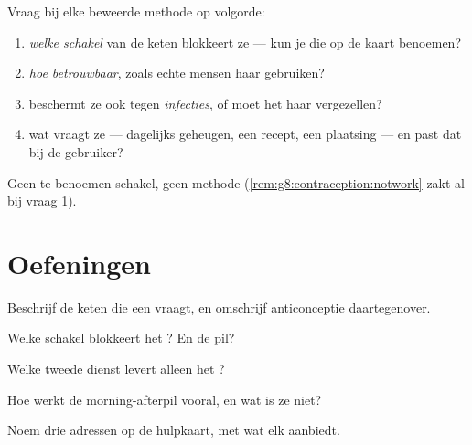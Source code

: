 \begin{method}\label{met:g8:contraception:evaluate}
Vraag bij elke beweerde methode op volgorde:
\begin{enumerate}
  \item \emph{welke schakel} van de keten blokkeert ze --- kun je die op
        de kaart benoemen?
  \item \emph{hoe betrouwbaar}, zoals echte mensen haar gebruiken?
  \item beschermt ze ook tegen \emph{infecties}, of moet het  haar
        vergezellen?
  \item wat vraagt ze --- dagelijks geheugen, een recept, een plaatsing
        --- en past dat bij de gebruiker?
\end{enumerate}
Geen te benoemen schakel, geen methode
(\cref{rem:g8:contraception:notwork} zakt al bij vraag 1).
\end{method}

\section{Oefeningen}

\begin{exercise}[$\star$]\label{exo:g8:contraception:1}
Beschrijf de keten die een  vraagt, en omschrijf anticonceptie
daartegenover.
\end{exercise}

\begin{exercise}[$\star$]\label{exo:g8:contraception:2}
Welke schakel blokkeert het ? En de pil?
\end{exercise}

\begin{exercise}[$\star$]\label{exo:g8:contraception:3}
Welke tweede dienst levert alleen het ?
\end{exercise}

\begin{exercise}[$\star$]\label{exo:g8:contraception:4}
Hoe werkt de morning-afterpil vooral, en wat is ze niet?
\end{exercise}

\begin{exercise}[$\star$]\label{exo:g8:contraception:5}
Noem drie adressen op de hulpkaart, met wat elk aanbiedt.
\end{exercise}

